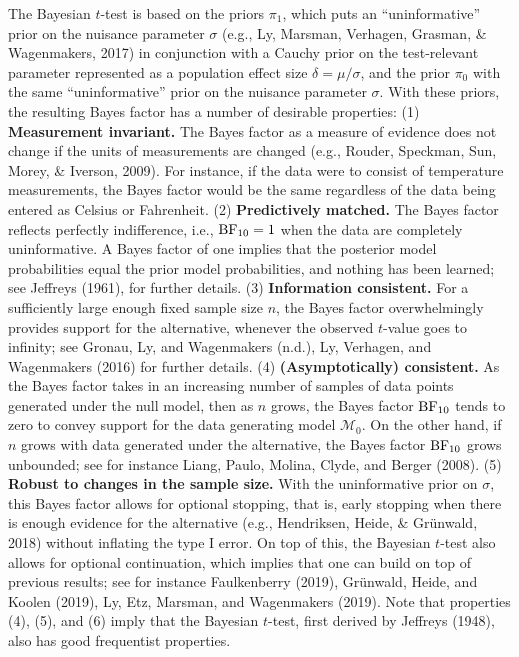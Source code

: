 \documentclass[english,,doc,floatsintext]{apa6}
\begin{document}
The Bayesian \(t\)-test is based on the priors \(\pi_{1}\), which puts an \enquote{uninformative} prior on the nuisance parameter \(\sigma\) (e.g., Ly, Marsman, Verhagen, Grasman, \& Wagenmakers, 2017) in conjunction with a Cauchy prior on the test-relevant parameter represented as a population effect size \(\delta = \mu / \sigma\), and the prior \(\pi_{0}\) with the same \enquote{uninformative} prior on the nuisance parameter \(\sigma\). With these priors, the resulting Bayes factor has a number of desirable properties: (1) \textbf{Measurement invariant.} The Bayes factor as a measure of evidence does not change if the units of measurements are changed (e.g., Rouder, Speckman, Sun, Morey, \& Iverson, 2009). For instance, if the data were to consist of temperature measurements, the Bayes factor would be the same regardless of the data being entered as Celsius or Fahrenheit. (2) \textbf{Predictively matched.} The Bayes factor reflects perfectly indifference, i.e., \(\textnormal{BF}_{10}=1\) when the data are completely uninformative. A Bayes factor of one implies that the posterior model probabilities equal the prior model probabilities, and nothing has been learned; see Jeffreys (1961), for further details. (3) \textbf{Information consistent.} For a sufficiently large enough fixed sample size \(n\), the Bayes factor overwhelmingly provides support for the alternative, whenever the observed \(t\)-value goes to infinity; see Gronau, Ly, and Wagenmakers (n.d.), Ly, Verhagen, and Wagenmakers (2016) for further details. (4) \textbf{(Asymptotically) consistent.} As the Bayes factor takes in an increasing number of samples of data points generated under the null model, then as \(n\) grows, the Bayes factor \(\textnormal{BF}_{10}\) tends to zero to convey support for the data generating model \(\mathcal{M}_{0}\). On the other hand, if \(n\) grows with data generated under the alternative, the Bayes factor \(\textnormal{BF}_{10}\) grows unbounded; see for instance Liang, Paulo, Molina, Clyde, and Berger (2008). (5) \textbf{Robust to changes in the sample size.} With the uninformative prior on \(\sigma\), this Bayes factor allows for optional stopping, that is, early stopping when there is enough evidence for the alternative (e.g., Hendriksen, Heide, \& Grünwald, 2018) without inflating the type I error. On top of this, the Bayesian \(t\)-test also allows for optional continuation, which implies that one can build on top of previous results; see for instance Faulkenberry (2019), Grünwald, Heide, and Koolen (2019), Ly, Etz, Marsman, and Wagenmakers (2019). Note that properties (4), (5), and (6) imply that the Bayesian \(t\)-test, first derived by Jeffreys (1948), also has good frequentist properties.
\end{document}
